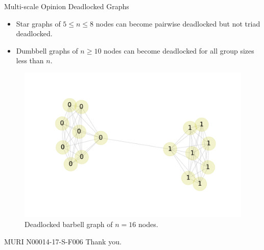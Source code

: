 \documentclass[usenames,dvipsnames,10pt]{beamer}
\theoremstyle{remark}
\begin{document}
\begin{frame}{Multi-scale Opinion Deadlocked Graphs}
\begin{itemize}
    \item Star graphs of $5\leq n \leq 8$ nodes can become pairwise deadlocked but not triad deadlocked.
    \item Dumbbell graphs of $n\geq 10$ nodes can become deadlocked for all group sizes less than $n$.
\end{itemize}
\begin{figure}[!htb]
    \centering
    \includegraphics[scale=0.22]{../Figures/barbell.pdf}
    \caption{Deadlocked barbell graph of $n=16$ nodes.}
    \label{fig:deadlockedBarbell}
\end{figure}
\end{frame}

\begin{frame}{}
\centering
    MURI N00014-17-S-F006
    \vfill
    Thank you.
\end{frame}

\end{document}
